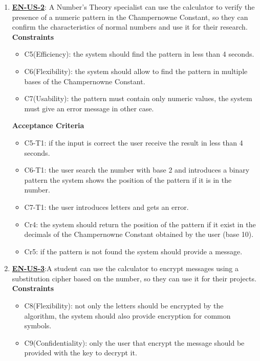 \documentclass{report}
\begin{document}
\begin{enumerate}
\begin{itemize}
\end{itemize}

\item \underline{\textbf{EN-US-2}}: A Number's Theory specialist can use the calculator to verify the presence of a numeric pattern in the Champernowne Constant, so they can confirm the characteristics of normal numbers and use it for their research. \\ \newline
\textbf{Constraints}
\begin{itemize}
    \item C5(Efficiency): the system should find the pattern in less than 4 seconds. 
    \item C6(Flexibility): the system should allow to find the pattern in multiple bases of the Champernowne Constant. 
    \item C7(Usability): the pattern must contain only numeric values, the system must give an error message in other case.\\
\end{itemize}

\textbf{Acceptance Criteria}
\begin{itemize}
    \item C5-T1: if the input is correct the user receive the result in less than 4 seconds. 
    \item C6-T1: the user search the number with base 2 and introduces a binary pattern the system shows the position of the pattern if it is in the number.
    \item C7-T1: the user introduces letters and gets an error.
    
    \item Cr4: the system should return the position of the pattern if it exist in the decimals of the Champernowne Constant obtained by the user (base 10). 
    \item Cr5: if the pattern is not found the system should provide a message. \newline
\end{itemize}

\item \underline{\textbf{EN-US-3}}:A student can use the calculator to encrypt messages using a substitution cipher based on the number, so they can use it for their projects. \\ \newline
\textbf{Constraints}
\begin{itemize}
    \item C8(Flexibility): not only the letters should be encrypted by the algorithm, the system should also provide encryption for common symbols. 
    \item C9(Confidentiality): only the user that encrypt the message should be provided with the key to decrypt it.
\end{itemize}


\end{enumerate}
\end{document}
